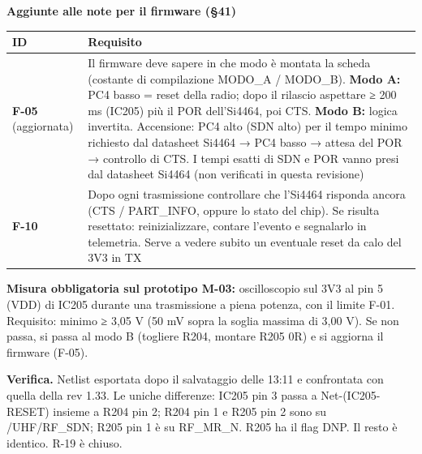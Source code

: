 \begin{notebox}
\textbf{Aggiunte alle note per il firmware (§41)}

\begin{center}{\small{}\setlength{\tabcolsep}{4pt}\renewcommand{\arraystretch}{1.1}
\begin{tabularx}{\linewidth}{>{\hsize=0.3976\hsize\raggedright\arraybackslash}X>{\hsize=1.6024\hsize\raggedright\arraybackslash}X}
\toprule
\textbf{ID} & \textbf{Requisito} \\
\midrule
\textbf{F-05} (aggiornata) & Il firmware deve sapere in che modo è montata la scheda (costante di compilazione MODO\_\allowbreak{}A /\allowbreak{} MODO\_\allowbreak{}B). \textbf{Modo A:} PC4 basso = reset della radio; dopo il rilascio aspettare ≥ 200 ms (IC205) più il POR dell'Si4464, poi CTS. \textbf{Modo B:} logica invertita. Accensione: PC4 alto (SDN alto) per il tempo minimo richiesto dal datasheet Si4464 → PC4 basso → attesa del POR → controllo di CTS. I tempi esatti di SDN e POR vanno presi dal datasheet Si4464 (non verificati in questa revisione) \\\midrule[0.15pt]
\textbf{F-10} & Dopo ogni trasmissione controllare che l'Si4464 risponda ancora (CTS /\allowbreak{} PART\_\allowbreak{}INFO, oppure lo stato del chip). Se risulta resettato: reinizializzare, contare l'evento e segnalarlo in telemetria. Serve a vedere subito un eventuale reset da calo del 3V3 in TX \\
\bottomrule
\end{tabularx}}\end{center}

\textbf{Misura obbligatoria sul prototipo M-03:} oscilloscopio sul 3V3 al pin 5 (VDD) di IC205 durante una trasmissione a piena potenza, con il limite F-01. Requisito: minimo ≥ 3,05 V (50 mV sopra la soglia massima di 3,00 V). Se non passa, si passa al modo B (togliere R204, montare R205 0R) e si aggiorna il firmware (F-05).
\end{notebox}

\textbf{Verifica.} Netlist esportata dopo il salvataggio delle 13:11 e confrontata con quella della rev 1.33. Le uniche differenze: IC205 pin 3 passa a Net-(IC205-RESET) insieme a R204 pin 2; R204 pin 1 e R205 pin 2 sono su /\allowbreak{}UHF/\allowbreak{}RF\_\allowbreak{}SDN; R205 pin 1 è su RF\_\allowbreak{}MR\_\allowbreak{}N. R205 ha il flag DNP. Il resto è identico. R-19 è chiuso.
